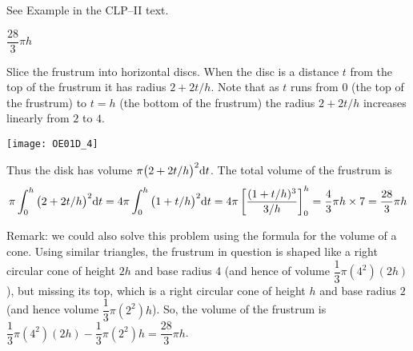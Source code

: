 \begin{hint}
See Example  in the
CLP--II text.
\end{hint}

\begin{answer}
$\dfrac{28}{3}\pi h$
\end{answer}

\begin{solution}
Slice the frustrum into horizontal discs. When the disc is a distance
$t$ from the top of the frustrum it has radius $2+2t/h$. Note that as $t$
runs from $0$ (the top of the frustrum) to $t=h$ (the bottom of the frustrum)
the radius $2+2t/h$ increases linearly from $2$ to $4$.
\begin{center}
       \texttt{[image: OE01D\_4]}
\end{center}
 Thus the disk has volume $\pi \big(2+2t/h\big)^2 \mathrm{d}t$. The total volume of the
frustrum is
\begin{align*}
\pi\int_0^h \big(2+2t/h\big)^2 \mathrm{d}t
=4\pi\int_0^h \big(1+t/h\big)^2 \mathrm{d}t
=4\pi\left[\frac{(1+t/h)^3}{3/h}\right]_0^h
=\frac{4}{3}\pi h\times 7
=\frac{28}{3}\pi h
\end{align*}

Remark: we could also solve this problem using the formula for the volume of a cone. Using similar triangles, the frustrum in question is shaped like a right circular cone of height $2h$ and base radius 4 (and hence of volume $\dfrac{1}{3}\pi(4^2)(2h)$), but missing its top, which is a right circular cone of height $h$ and base radius $2$ (and hence volume $\dfrac{1}{3}\pi(2^2)h$). So, the volume of the frustrum is $\dfrac{1}{3}\pi(4^2)(2h) - \dfrac{1}{3}\pi(2^2)h = \dfrac{28}{3}\pi h$.
\end{solution}







\subsection*{\Application}

